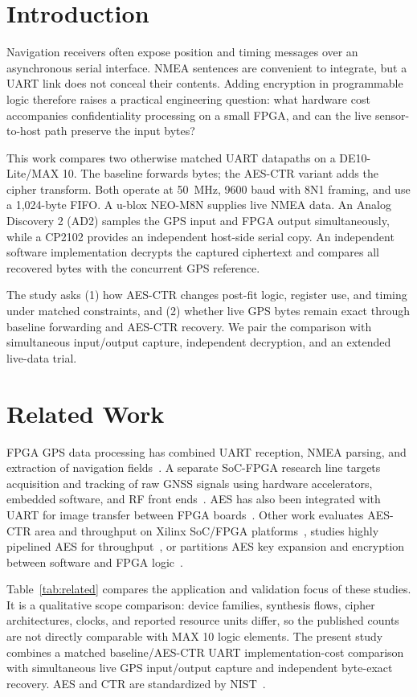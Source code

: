 \documentclass[runningheads]{llncs}
\begin{document}
\section{Introduction}
Navigation receivers often expose position and timing messages over an asynchronous serial interface. NMEA sentences are convenient to integrate, but a UART link does not conceal their contents. Adding encryption in programmable logic therefore raises a practical engineering question: what hardware cost accompanies confidentiality processing on a small FPGA, and can the live sensor-to-host path preserve the input bytes?

This work compares two otherwise matched UART datapaths on a DE10-Lite/MAX 10. The baseline forwards bytes; the AES-CTR variant adds the cipher transform. Both operate at 50~MHz, 9600 baud with 8N1 framing, and use a 1,024-byte FIFO. A u-blox NEO-M8N supplies live NMEA data. An Analog Discovery 2 (AD2) samples the GPS input and FPGA output simultaneously, while a CP2102 provides an independent host-side serial copy. An independent software implementation decrypts the captured ciphertext and compares all recovered bytes with the concurrent GPS reference.

The study asks (1) how AES-CTR changes post-fit logic, register use, and timing under matched constraints, and (2) whether live GPS bytes remain exact through baseline forwarding and AES-CTR recovery. We pair the comparison with simultaneous input/output capture, independent decryption, and an extended live-data trial.

\section{Related Work}
FPGA GPS data processing has combined UART reception, NMEA parsing, and extraction of navigation fields~\cite{Abidin2020}. A separate SoC-FPGA research line targets acquisition and tracking of raw GNSS signals using hardware accelerators, embedded software, and RF front ends~\cite{Majoral2023}. AES has also been integrated with UART for image transfer between FPGA boards~\cite{Prasanna2022}. Other work evaluates AES-CTR area and throughput on Xilinx SoC/FPGA platforms~\cite{Paz2024}, studies highly pipelined AES for throughput~\cite{Visconti2020}, or partitions AES key expansion and encryption between software and FPGA logic~\cite{Azzouzi2025}.

Table~\ref{tab:related} compares the application and validation focus of these studies. It is a qualitative scope comparison: device families, synthesis flows, cipher architectures, clocks, and reported resource units differ, so the published counts are not directly comparable with MAX 10 logic elements. The present study combines a matched baseline/AES-CTR UART implementation-cost comparison with simultaneous live GPS input/output capture and independent byte-exact recovery. AES and CTR are standardized by NIST~\cite{FIPS197,SP80038A}.
\end{document}
